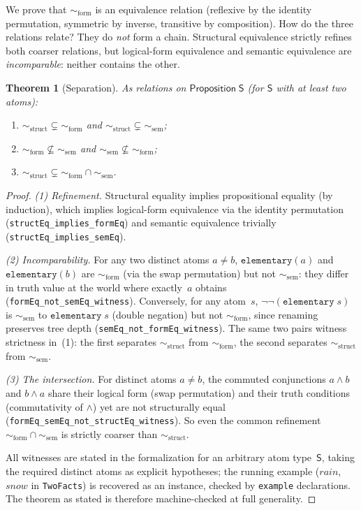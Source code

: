 \documentclass[10pt, letterpaper]{article}
\newtheorem{theorem}{Theorem}[section]
\theoremstyle{definition}
\theoremstyle{remark}
\newcommand{\Sach}{\mathsf{S}}
\newcommand{\structEq}{\sim_{\mathrm{struct}}}
\newcommand{\formEq}{\sim_{\mathrm{form}}}
\newcommand{\semEq}{\sim_{\mathrm{sem}}}
\begin{document}
\noindent
We prove that $\formEq$ is an equivalence relation (reflexive by
the identity permutation, symmetric by inverse, transitive by
composition).  How do the three relations relate?  They do
\emph{not} form a chain.  Structural equivalence strictly refines
both coarser relations, but logical-form equivalence and semantic
equivalence are \emph{incomparable}: neither contains the other.

\begin{theorem}[Separation]
\label{thm:hierarchy}
As relations on $\mathsf{Proposition}\;\Sach$ (for $\Sach$ with
at least two atoms):
\begin{enumerate}[nosep]
  \item $\structEq \subsetneq \formEq$ and
        $\structEq \subsetneq \semEq$;
  \item $\formEq \not\subseteq \semEq$ and
        $\semEq \not\subseteq \formEq$;
  \item $\structEq \subsetneq \formEq \cap \semEq$.
\end{enumerate}
\end{theorem}

\begin{proof}
\emph{(1) Refinement.}  Structural equality implies propositional
equality (by induction), which implies logical-form equivalence
via the identity permutation
(\texttt{structEq\_implies\_formEq}) and semantic equivalence
trivially (\texttt{structEq\_implies\_semEq}).

\emph{(2) Incomparability.}
For any two distinct atoms $a \neq b$,
$\mathtt{elementary}(a)$ and $\mathtt{elementary}(b)$ are
$\formEq$ (via the swap permutation) but not $\semEq$: they
differ in truth value at the world where exactly~$a$ obtains
(\texttt{formEq\_not\_\allowbreak{}semEq\_\allowbreak{}witness}).  Conversely,
for any atom~$s$, $\lnot\lnot(\mathtt{elementary}\;s)$ is
$\semEq$ to $\mathtt{elementary}\;s$ (double negation) but not
$\formEq$, since renaming preserves tree depth
(\texttt{semEq\_not\_formEq\_witness}).  The same two pairs
witness strictness in~(1): the first separates $\structEq$ from
$\formEq$, the second separates $\structEq$ from $\semEq$.

\emph{(3) The intersection.}  For distinct atoms $a \neq b$,
the commuted conjunctions $a \wedge b$ and $b \wedge a$ share
their logical form (swap permutation) and their truth conditions
(commutativity of $\wedge$) yet are not structurally equal
(\texttt{formEq\_\allowbreak{}semEq\_\allowbreak{}not\_\allowbreak{}structEq\_\allowbreak{}witness}).  So even
the common refinement $\formEq \cap \semEq$ is strictly
coarser than $\structEq$.

All witnesses are stated in the formalization for an arbitrary
atom type~$\Sach$, taking the required distinct atoms as
explicit hypotheses; the running example
($\mathit{rain}$, $\mathit{snow}$ in \texttt{TwoFacts}) is
recovered as an instance, checked by \texttt{example}
declarations.  The theorem as stated is therefore machine-checked
at full generality.
\end{proof}
\end{document}

